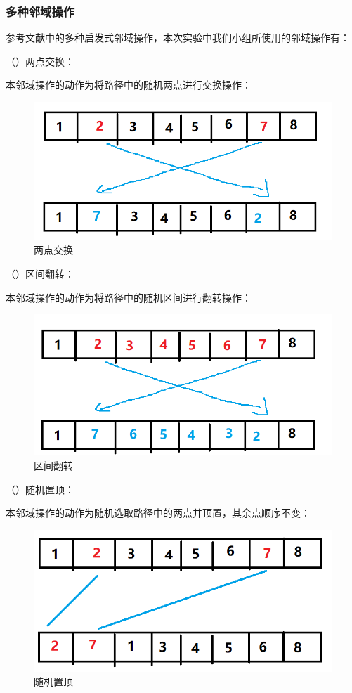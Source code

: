 \documentclass[withoutpreface,bwprint]{cumcmthesis} %
\newcounter{Emp}[subsubsection]	%
\newcommand{\kuohao}{\addtocounter{Emp}{1} \noindent （\theEmp）}
\begin{document}
\subsubsection{多种邻域操作}

参考文献\cite{1}中的多种启发式邻域操作，本次实验中我们小组所使用的邻域操作有：

\kuohao 两点交换：

本邻域操作的动作为将路径中的随机两点进行交换操作：
\begin{figure}[H]
	\centering
	\includegraphics[width=0.5\linewidth]{swap}
	\caption{两点交换}
\end{figure}

\kuohao 区间翻转：

本邻域操作的动作为将路径中的随机区间进行翻转操作：
\begin{figure}[H]
	\centering
	\includegraphics[width=0.5\linewidth]{reverse}
	\caption{区间翻转}
\end{figure}
\kuohao 随机置顶：

本邻域操作的动作为随机选取路径中的两点并顶置，其余点顺序不变：
\begin{figure}[H]
	\centering
	\includegraphics[width=0.5\linewidth]{rd_top}
	\caption{随机置顶}
\end{figure}
\end{document}
